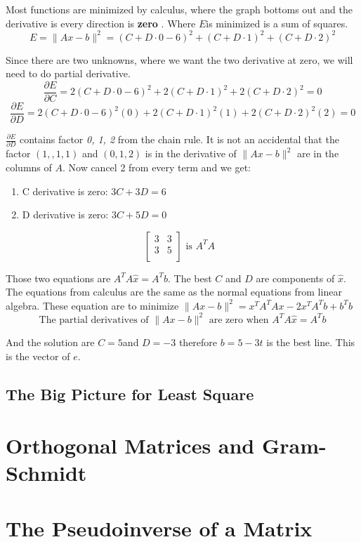 Most functions are minimized by calculus, where the graph bottoms out and the derivative is every direction is \textbf{zero} . Where \(E\)is minimized is a sum of squares. 
\[
    E = \lVert Ax - b \rVert^2 = (C + D \cdot 0 - 6)^2 + (C + D \cdot 1)^2 + (C + D \cdot 2)^2 
\] 

Since there are two unknowns, where we want the two derivative at zero, we will need to do partial derivative. 
\[
    \frac{\partial E}{\partial C} = 2(C + D \cdot 0 - 6)^2 + 2(C + D \cdot 1)^2 + 2(C + D \cdot 2)^2 = 0
\]
\[
    \frac{\partial E}{\partial D} = 2(C + D \cdot 0 - 6)^2 (0) + 2(C + D \cdot 1)^2 (1) + 2(C + D \cdot 2)^2 (2) = 0
\]

\(\frac{\partial E}{\partial D}\) contains factor \emph{0, 1, 2} from the chain rule. It is not an accidental that the factor \((1, ,1 ,1)\) and \((0,1,2)\) is in the derivative of \(\lVert Ax - b \rVert^2 \) are in the columns of \(A\). Now cancel 2 from every term and we get: 
\begin{enumerate}
    \item C derivative is zero: \(3C + 3D = 6\)
    \item D derivative is zero: \(3C + 5D = 0\) 
\end{enumerate}     
\[
    \begin{bmatrix}
        3 & 3  \\
        3 & 5  \\
    \end{bmatrix}
    \text{ is \(A^T A\) }
\]

Those two equations are \(A^T A \hat{x} = A^T b\). The best \(C\) and \(D\) are components of \(\hat{x}\). The equations from calculus are the same as the normal equations from linear algebra. These equation are to minimize \(\lVert Ax - b \rVert^2 = x^T A^T Ax - 2x^T A^T b + b^T b \)
\[
    \text{The partial derivatives of  } \lVert Ax - b \rVert^2 \text{ are zero when } A^T A\hat{x} = A^T b  
\]     

And the solution are \(C = 5\)and \(D = -3\) therefore \(b = 5 - 3t\) is the best line. This is the vector of \(e\). 

\subsection{The Big Picture for Least Square}

\section{Orthogonal Matrices and Gram-Schmidt}

\section{The Pseudoinverse of a Matrix}
